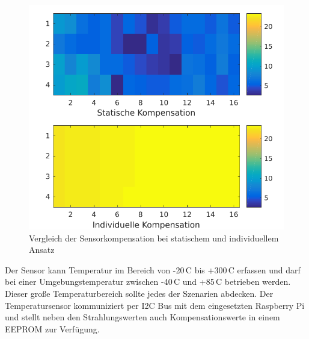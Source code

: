 \documentclass{sigchi}
\begin{document}
\begin{figure}
	\centering
	\includegraphics[width=\columnwidth]{fig/thermal_img_static_dyn.pdf}
	\caption{Vergleich der Sensorkompensation bei statischem und individuellem Ansatz}
	\label{fig:temp_ir:komp_vgl}
\end{figure}
Der Sensor kann Temperatur im Bereich von -20\,\textdegree{}C bis +300\,\textdegree{}C erfassen und darf bei einer Umgebungstemperatur zwischen -40\,\textdegree{}C und +85\,\textdegree{}C betrieben werden. Dieser große Temperaturbereich sollte jedes der Szenarien abdecken. Der Temperatursensor kommuniziert per \gls{I2C} Bus mit dem eingesetzten Raspberry Pi und stellt neben den Strahlungswerten auch Kompensationswerte in einem \gls{EEPROM} zur Verfügung.\\
\end{document}
